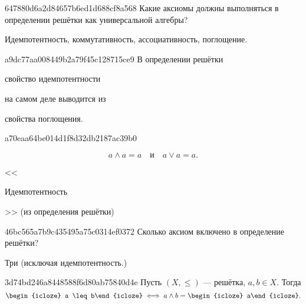 \begin{note}{647880d6a2d84657b6ed1d688cf8a568}
    Какие аксиомы должны выполняться в определении решётки как универсальной алгебры?

    \begin{cloze}{1}
        Идемпотентность, коммутативность, ассоциативность, поглощение.
    \end{cloze}
\end{note}

\begin{note}{a9dc77aa008449b2a79f45c128715ce9}
    В определении решётки \begin{icloze}{1}свойство идемпотентности\end{icloze} на самом деле выводится из \begin{icloze}{2}свойства поглощения.\end{icloze}
\end{note}

\begin{note}{a70eaa64be014d1f8d32db2187ac39b0}
    \begin{icloze}{1}
        \[
            a \land a = a \quad \text{и} \quad a \lor a = a.
        \]
    \end{icloze}

    \begin{center}
        \tiny
        <<\begin{icloze}{2}Идемпотентность\end{icloze}>> (из определения решётки)
    \end{center}
\end{note}

\begin{note}{46bc565a7b9c435495a75c0314ef0372}
    Сколько аксиом включено в определение решётки?

    \begin{cloze}{1}
        Три (исключая идемпотентность.)
    \end{cloze}
\end{note}

\begin{note}{3d74bd246a8448588f6d80ab75840d4e}
    Пусть \({ (X, \leqslant) }\) --- решётка,\: \({ a, b \in X }\).
    Тогда
    \[
        \begin{icloze}{2}a \leq b\end{icloze} \iff a \land b = \begin{icloze}{1}a\end{icloze}.
    \]
\end{note}

